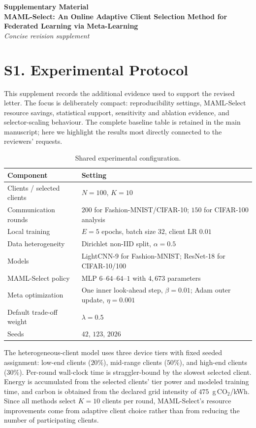 \documentclass[10pt]{article}
\begin{document}
\begin{center}
{\Large \textbf{Supplementary Material}}\\[0.35em]
{\large \textbf{MAML-Select: An Online Adaptive Client Selection Method for Federated Learning via Meta-Learning}}\\[0.25em]
{\normalsize \textit{Concise revision supplement}}
\end{center}

\section*{S1. Experimental Protocol}

This supplement records the additional evidence used to support the revised letter.  The focus is deliberately compact: reproducibility settings, MAML-Select resource savings, statistical support, sensitivity and ablation evidence, and selector-scaling behaviour.  The complete baseline table is retained in the main manuscript; here we highlight the results most directly connected to the reviewers' requests.

\begin{table}[!ht]
\centering
\caption{Shared experimental configuration.}
\label{tab:supp_config}
\small
\begin{tabular}{@{}ll@{}}
\toprule
Component & Setting \\
\midrule
Clients / selected clients & $N=100$, $K=10$ \\
Communication rounds & $200$ for Fashion-MNIST/CIFAR-10; $150$ for CIFAR-100 analysis \\
Local training & $E=5$ epochs, batch size $32$, client LR $0.01$ \\
Data heterogeneity & Dirichlet non-IID split, $\alpha=0.5$ \\
Models & LightCNN-9 for Fashion-MNIST; ResNet-18 for CIFAR-10/100 \\
MAML-Select policy & MLP $6$--$64$--$64$--$1$ with $4{,}673$ parameters \\
Meta optimization & One inner look-ahead step, $\beta=0.01$; Adam outer update, $\eta=0.001$ \\
Default trade-off weight & $\lambda=0.5$ \\
Seeds & $42$, $123$, $2026$ \\
\bottomrule
\end{tabular}
\end{table}

The heterogeneous-client model uses three device tiers with fixed seeded assignment: low-end clients ($20\%$), mid-range clients ($50\%$), and high-end clients ($30\%$).  Per-round wall-clock time is straggler-bound by the slowest selected client.  Energy is accumulated from the selected clients' tier power and modeled training time, and carbon is obtained from the declared grid intensity of $475$~g\,CO$_2$/kWh.  Since all methods select $K=10$ clients per round, MAML-Select's resource improvements come from adaptive client choice rather than from reducing the number of participating clients.
\end{document}

